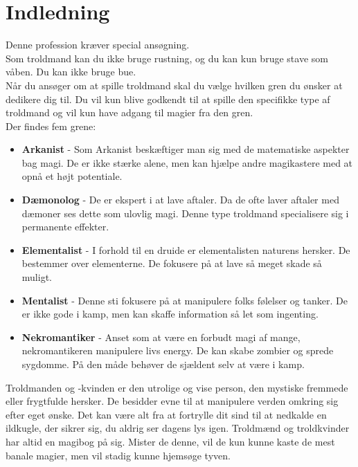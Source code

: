 \chapter*{Indledning}

Denne profession kræver special ansøgning.\\
Som troldmand kan du ikke bruge rustning, og du kan kun bruge stave som våben. Du kan ikke bruge bue.\\

Når du ansøger om at spille troldmand skal du vælge hvilken gren du ønsker at dedikere dig til. Du vil kun blive godkendt til at spille den specifikke type af troldmand og vil kun have adgang til magier fra den gren.\\
Der findes fem grene:\\
\begin{itemize}
    \item \textbf{Arkanist} - Som Arkanist beskæftiger man sig med de matematiske aspekter bag magi. De er ikke stærke alene, men kan hjælpe andre magikastere med at opnå et højt potentiale.
    \item \textbf{Dæmonolog} - De er ekspert i at lave aftaler. Da de ofte laver aftaler med dæmoner ses dette som ulovlig magi. Denne type troldmand specialisere sig i permanente effekter.
    \item \textbf{Elementalist} - I forhold til en druide er elementalisten naturens hersker. De bestemmer over elementerne. De fokusere på at lave så meget skade så muligt.
    \item \textbf{Mentalist} - Denne sti fokusere på at manipulere folks følelser og tanker. De er ikke gode i kamp, men kan skaffe information så let som ingenting.
    \item \textbf{Nekromantiker} - Anset som at være en forbudt magi af mange, nekromantikeren manipulere livs energy. De kan skabe zombier og sprede sygdomme. På den måde behøver de sjældent selv at være i kamp.
\end{itemize}

Troldmanden og -kvinden er den utrolige og vise person, den mystiske fremmede eller frygtfulde
hersker. De besidder evne til at manipulere verden omkring sig efter eget ønske. Det kan være alt fra
at fortrylle dit sind til at nedkalde en ildkugle, der sikrer sig, du aldrig ser dagens lys igen. Troldmænd
og troldkvinder har altid en magibog på sig. Mister de denne, vil de kun kunne kaste de mest banale
magier, men vil stadig kunne hjemsøge tyven.

